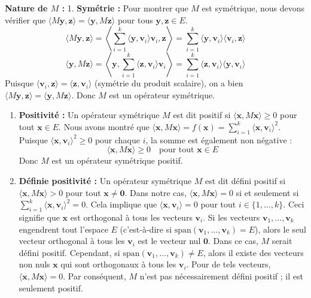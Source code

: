 \documentclass[11pt,a4paper]{report}
\begin{document}
\textbf{Nature de \(M\) :} 1. \textbf{Symétrie :} Pour montrer que \(M\)
est symétrique, nous devons vérifier que
\(\langle M\mathbf{y}, \mathbf{z} \rangle = \langle \mathbf{y}, M\mathbf{z} \rangle\)
pour tous \(\mathbf{y}, \mathbf{z} \in E\).
\[ \langle M\mathbf{y}, \mathbf{z} \rangle = \left\langle \sum_{i=1}^k \langle \mathbf{y}, \mathbf{v}_i \rangle \mathbf{v}_i, \mathbf{z} \right\rangle = \sum_{i=1}^k \langle \mathbf{y}, \mathbf{v}_i \rangle \langle \mathbf{v}_i, \mathbf{z} \rangle \]
\[ \langle \mathbf{y}, M\mathbf{z} \rangle = \left\langle \mathbf{y}, \sum_{i=1}^k \langle \mathbf{z}, \mathbf{v}_i \rangle \mathbf{v}_i \right\rangle = \sum_{i=1}^k \langle \mathbf{z}, \mathbf{v}_i \rangle \langle \mathbf{y}, \mathbf{v}_i \rangle \]
Puisque
\(\langle \mathbf{v}_i, \mathbf{z} \rangle = \langle \mathbf{z}, \mathbf{v}_i \rangle\)
(symétrie du produit scalaire), on a bien
\(\langle M\mathbf{y}, \mathbf{z} \rangle = \langle \mathbf{y}, M\mathbf{z} \rangle\).
Donc \(M\) est un opérateur symétrique.

\begin{enumerate}
\def\labelenumi{\arabic{enumi}.}
\setcounter{enumi}{1}
\item
  \textbf{Positivité :} Un opérateur symétrique \(M\) est dit positif si
  \(\langle \mathbf{x}, M\mathbf{x} \rangle \ge 0\) pour tout
  \(\mathbf{x} \in E\). Nous avons montré que
  \(\langle \mathbf{x}, M\mathbf{x} \rangle = f(\mathbf{x}) = \sum_{i=1}^k \langle \mathbf{x}, \mathbf{v}_i \rangle^2\).
  Puisque \(\langle \mathbf{x}, \mathbf{v}_i \rangle^2 \ge 0\) pour
  chaque \(i\), la somme est également non négative :
  \[ \langle \mathbf{x}, M\mathbf{x} \rangle \ge 0 \quad \text{pour tout } \mathbf{x} \in E \]
  Donc \(M\) est un opérateur symétrique positif.
\item
  \textbf{Définie positivité :} Un opérateur symétrique \(M\) est dit
  défini positif si \(\langle \mathbf{x}, M\mathbf{x} \rangle > 0\) pour
  tout \(\mathbf{x} \ne \mathbf{0}\). Dans notre cas,
  \(\langle \mathbf{x}, M\mathbf{x} \rangle = 0\) si et seulement si
  \(\sum_{i=1}^k \langle \mathbf{x}, \mathbf{v}_i \rangle^2 = 0\). Cela
  implique que \(\langle \mathbf{x}, \mathbf{v}_i \rangle = 0\) pour
  tout \(i \in \{1, \dots, k\}\). Ceci signifie que \(\mathbf{x}\) est
  orthogonal à tous les vecteurs \(\mathbf{v}_i\). Si les vecteurs
  \(\mathbf{v}_1, \dots, \mathbf{v}_k\) engendrent tout l'espace \(E\)
  (c'est-à-dire si
  \(\text{span}(\mathbf{v}_1, \dots, \mathbf{v}_k) = E\)), alors le seul
  vecteur orthogonal à tous les \(\mathbf{v}_i\) est le vecteur nul
  \(\mathbf{0}\). Dans ce cas, \(M\) serait défini positif. Cependant,
  si \(\text{span}(\mathbf{v}_1, \dots, \mathbf{v}_k) \ne E\), alors il
  existe des vecteurs non nuls \(\mathbf{x}\) qui sont orthogonaux à
  tous les \(\mathbf{v}_i\). Pour de tels vecteurs,
  \(\langle \mathbf{x}, M\mathbf{x} \rangle = 0\). Par conséquent, \(M\)
  n'est pas nécessairement défini positif ; il est seulement positif.
\end{enumerate}
\end{document}
